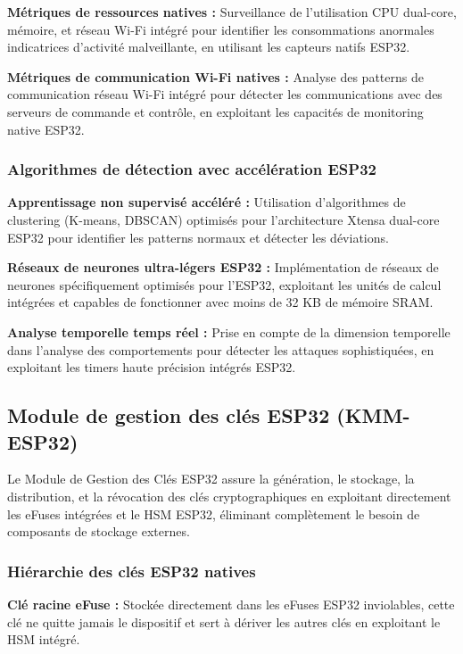 \textbf{Métriques de ressources natives :} Surveillance de l'utilisation CPU dual-core, mémoire, et réseau Wi-Fi intégré pour identifier les consommations anormales indicatrices d'activité malveillante, en utilisant les capteurs natifs ESP32.

\textbf{Métriques de communication Wi-Fi natives :} Analyse des patterns de communication réseau Wi-Fi intégré pour détecter les communications avec des serveurs de commande et contrôle, en exploitant les capacités de monitoring native ESP32.

\subsubsection{Algorithmes de détection avec accélération ESP32}

\textbf{Apprentissage non supervisé accéléré :} Utilisation d'algorithmes de clustering (K-means, DBSCAN) optimisés pour l'architecture Xtensa dual-core ESP32 pour identifier les patterns normaux et détecter les déviations.

\textbf{Réseaux de neurones ultra-légers ESP32 :} Implémentation de réseaux de neurones spécifiquement optimisés pour l'ESP32, exploitant les unités de calcul intégrées et capables de fonctionner avec moins de 32 KB de mémoire SRAM.

\textbf{Analyse temporelle temps réel :} Prise en compte de la dimension temporelle dans l'analyse des comportements pour détecter les attaques sophistiquées, en exploitant les timers haute précision intégrés ESP32.

\subsection{Module de gestion des clés ESP32 (KMM-ESP32)}

Le Module de Gestion des Clés ESP32 assure la génération, le stockage, la distribution, et la révocation des clés cryptographiques en exploitant directement les eFuses intégrées et le HSM ESP32, éliminant complètement le besoin de composants de stockage externes.

\subsubsection{Hiérarchie des clés ESP32 natives}

\textbf{Clé racine eFuse :} Stockée directement dans les eFuses ESP32 inviolables, cette clé ne quitte jamais le dispositif et sert à dériver les autres clés en exploitant le HSM intégré.

